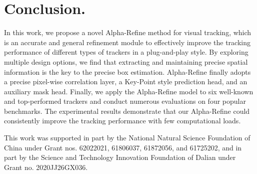\documentclass[final]{cvpr}
\begin{document}
\section{Conclusion.}
In this work, we propose a novel Alpha-Refine method for visual tracking, which is an accurate and general 
refinement module to effectively improve the tracking performance of different types of trackers in a plug-and-play style. 
By exploring multiple design options, we find that extracting and maintaining precise spatial information is the key to the precise box estimation. Alpha-Refine finally adopts a precise pixel-wise correlation layer, a Key-Point style prediction head, 
and an auxiliary mask head. Finally, we apply the Alpha-Refine model to six well-known and top-performed trackers and conduct 
numerous evaluations on four popular benchmarks. The experimental results demonstrate that our Alpha-Refine could consistently 
improve the tracking performance with few computational loads.
\vspace{4mm}


This work was supported in part by the National Natural Science Foundation of China 
under Grant nos. 62022021, 61806037, 61872056, and 61725202, and in part by the Science and Technology Innovation 
Foundation of Dalian under Grant no. 2020JJ26GX036.

\clearpage
{\small


}
\end{document}
